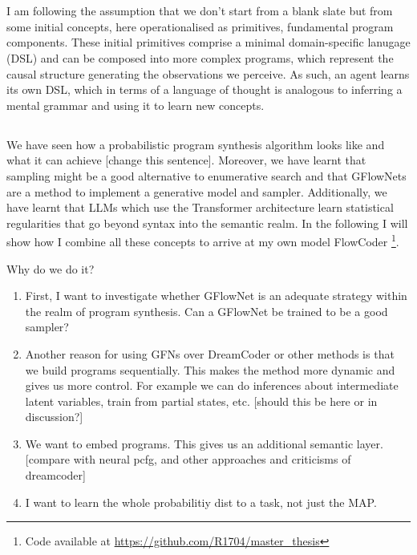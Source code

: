 \section{}

I am following the assumption that we don't start from a blank slate but from some initial concepts, here operationalised as primitives, fundamental program components. These initial primitives comprise a minimal domain-specific lanugage (DSL) and can be composed into more complex programs, which represent the causal structure generating the observations we perceive. As such, an agent learns its own DSL, which in terms of a language of thought is analogous to inferring a mental grammar and using it to learn new concepts.



\subsection{}

We have seen how a probabilistic program synthesis algorithm looks like and what it can achieve [change this sentence]. 
Moreover, we have learnt that sampling might be a good alternative to enumerative search and that GFlowNets are a method to implement a generative model and sampler. Additionally, we have learnt that LLMs which use the Transformer architecture learn statistical regularities that go beyond syntax into the semantic realm. In the following I will show how I combine all these concepts to arrive at my own model \textrm{FlowCoder} \footnote{Code available at \url{https://github.com/R1704/master_thesis}}.


Why do we do it?
\begin{enumerate}
    \item First, I want to investigate whether GFlowNet is an adequate strategy within the realm of program synthesis. Can a GFlowNet be trained to be a good sampler?
    \item Another reason for using GFNs over DreamCoder or other methods is that we build programs sequentially. This makes the method more dynamic and gives us more control. For example we can do inferences about intermediate latent variables, train from partial states, etc. [should this be here or in discussion?]
    \item We want to embed programs. This gives us an additional semantic layer. [compare with neural pcfg, and other approaches and criticisms of dreamcoder]
    \item I want to learn the whole probabilitiy dist to a task, not just the MAP.
\end{enumerate}






